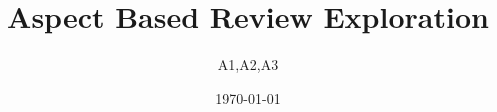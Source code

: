 \documentclass{sig-alternate-05-2015}
\begin{document}

\title{Aspect Based Review Exploration}
\author{A1,A2,A3}

\date{\today}

\maketitle
	\begin{abstract} 
		
	\end{abstract}










	
	
	
	
	
	
	
    

\balance
	 
	
	\balancecolumns




\end{document}

